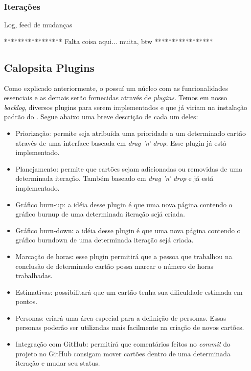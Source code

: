 \subsubsection*{Iterações}



Log, feed de mudanças

*****************
Falta coisa aqui... muita, btw
*****************

 

\subsection{Calopsita Plugins}

Como explicado anteriormente, o \calopsita{} possuí um núcleo com as funcionalidades essenciais e as demais serão fornecidas através de \textit{plugins}. Temos em nosso \textit{backlog}, diversos plugins para serem implementados e que já viriam na instalação padrão do \calopsita{}. Segue abaixo uma breve descrição de cada um deles:

\begin{itemize}
	\item{Priorização: permite seja atribuída uma prioridade a um determinado cartão através de uma interface baseada em \textit{drag 'n' drop}. Esse plugin já está implementado.}
	\item{Planejamento: permite que cartões sejam adicionadas ou removidas de uma determinada iteração. Também baseado em \textit{drag 'n' drop} e já está implementado.}
	\item{Gráfico burn-up: a idéia desse plugin é que uma nova página contendo o gráfico burnup de uma determinada iteração sejá criada.}
	\item{Gráfico burn-down: a idéia desse plugin é que uma nova página contendo o gráfico burndown de uma determinada iteração sejá criada.}
	\item{Marcação de horas: esse plugin permitirá que a pessoa que trabalhou na conclusão de determinado cartão possa marcar o número de horas trabalhadas.}
	\item{Estimativas: possibilitará que um cartão tenha sua dificuldade estimada em pontos.}
	\item{Personas: criará uma área especial para a definição de personas. Essas personas poderão ser utilizadas mais facilmente na criação de novos cartões.}
	\item{Integração com GitHub: permitírá que comentários feitos no \textit{commit} do projeto no GitHub consigam mover cartões dentro de uma determinada iteração e mudar seu status.}
\end{itemize}


